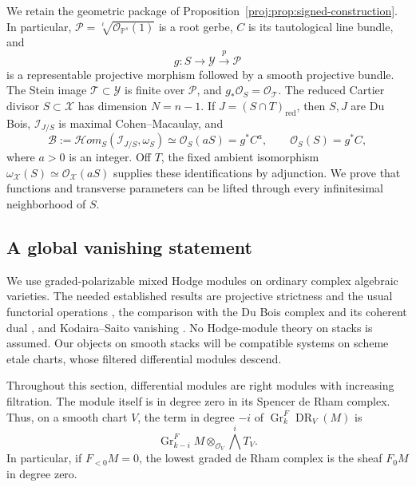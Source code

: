 \documentclass[11pt,letterpaper]{article}
\theoremstyle{definition}
\theoremstyle{remark}
\begin{document}
We retain the geometric package of
Proposition~\ref{proj:prop:signed-construction}.  In particular,
\(\mathcal P=\sqrt[\ell]{\mathcal{O}_{\mathbb{P}^s}(1)}\) is a root gerbe, \(C\) is
its tautological line bundle, and
\[
 g:S\longrightarrow\mathcal Y
 \xrightarrow{p}\mathcal P
\]
is a representable projective morphism followed by a smooth projective
bundle.  The Stein image \(\mathcal T\subset\mathcal Y\) is finite over
\(\mathcal P\), and \(g_*\mathcal{O}_S=\mathcal{O}_{\mathcal T}\).  The reduced Cartier
divisor \(S\subset\mathcal X\) has dimension \(N=n-1\).  If
\(J=(S\cap T)_{\mathrm{red}}\), then \(S,J\) are Du Bois,
\(\mathcal I_{J/S}\) is maximal Cohen--Macaulay, and
\begin{equation}\label{proj:hg:geometric-lines}
 \mathcal B:=
 \mathcal Hom_S(\mathcal I_{J/S},\omega_S)
 \simeq \mathcal{O}_S(aS)=g^*C^a,
 \qquad
 \mathcal{O}_S(S)=g^*C,
\end{equation}
where \(a>0\) is an integer.  Off \(T\), the fixed ambient isomorphism
\(\omega_{\mathcal X}(S)\simeq\mathcal{O}_{\mathcal X}(aS)\) supplies these
identifications by adjunction.  We prove that functions and transverse
parameters can be lifted through every infinitesimal neighborhood of
\(S\).

\subsection{A global vanishing statement}

We use graded-polarizable mixed Hodge modules on ordinary complex
algebraic varieties.  The needed established results are projective
strictness and the usual functorial operations
\cite[Theorem~2.14 and Section~4]{Proj-Saito1990}, the comparison with the
Du Bois complex and its coherent dual
\cite[Theorem~0.2 and Corollary~0.3]{Proj-Saito2000}, and
Kodaira--Saito vanishing \cite[Proposition~2.33]{Proj-Saito1990}.
No Hodge-module theory on stacks is assumed.  Our objects on smooth
stacks will be compatible systems on scheme etale charts, whose
filtered differential modules descend.

Throughout this section, differential modules are right modules with
increasing filtration.  The module itself is in degree zero in its
Spencer de Rham complex.  Thus, on a smooth chart \(V\), the term in
degree \(-i\) of \(\operatorname{Gr}^F_k\operatorname{DR}_V(M)\) is
\[
 \operatorname{Gr}^F_{k-i}M\otimes_{\mathcal{O}_V}\bigwedge^iT_V.
\]
In particular, if \(F_{<0}M=0\), the lowest graded de Rham complex is
the sheaf \(F_0M\) in degree zero.
\end{document}
